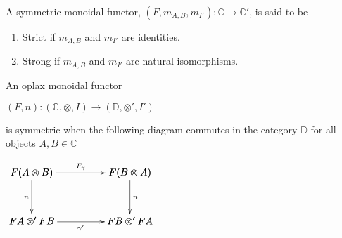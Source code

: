 \begin{definition}
    A symmetric monoidal functor, $(F,m_{A,B},m_{I'}): \mathbb{C} \rightarrow \mathbb{C}'$, is said to be
    \begin{enumerate}
        \item Strict if $m_{A,B}$ and $m_{I'}$ are identities.
        \item Strong if $m_{A,B}$ and $m_{I'}$ are natural isomorphisms.
    \end{enumerate}
    \cite{bierman1993}
\end{definition}


\begin{definition}
    An oplax monoidal functor
    \begin{center}
        \begin{math}
            (F,n) : (\mathbb{C}, \otimes, I) \rightarrow (\mathbb{D}, \otimes ', I')
        \end{math}
    \end{center}
    is symmetric when the following diagram commutes in the category $\mathbb{D}$ for all objects $A,B \in \mathbb{C}$
    \begin{center}
        \begin{math}
            \bfig
                \square<1000,500>[
                    F(A \otimes B)`
                    F(B \otimes A)`
                    FA \otimes ' FB`
                    FB \otimes ' FA;
                    F_\gamma`
                    n`
                    n`
                    \gamma '
                ]
            \efig
        \end{math}
    \end{center}
    \cite{mellies2009}
\end{definition}
